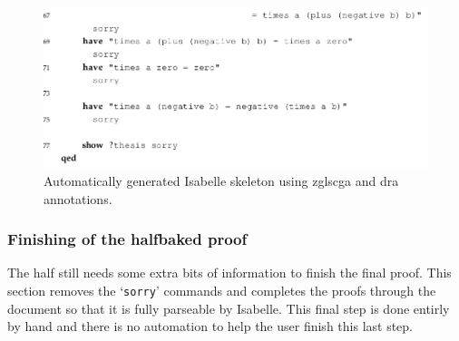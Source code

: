 \begin{figure}[H]
\begin{center}
\includegraphics[scale=0.45]{Figures/Background/ringskel4.png}
\end{center}
\caption{Automatically generated Isabelle skeleton using zgls{cga} and \gls{dra} annotations. \label{fig:ringskel}}
\end{figure}

\subsubsection{Finishing of the halfbaked proof}

The \gls{half} still needs some extra bits of information to finish the final proof. This section removes the `\texttt{sorry}' commands and completes the proofs through the document so that it is fully parseable by Isabelle. This final step is done entirly by hand and there is no automation to help the user finish this last step.



